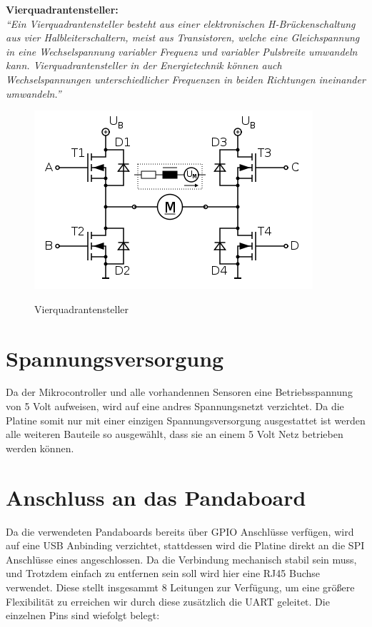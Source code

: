 \begin{minipage}{0.9\textwidth}
\textbf{Vierquadrantensteller:\\}
\emph{``Ein Vierquadrantensteller besteht aus einer elektronischen H-Brückenschaltung aus vier Halbleiterschaltern, meist aus Transistoren, 
welche eine Gleichspannung in eine Wechselspannung variabler Frequenz und variabler Pulsbreite umwandeln kann. Vierquadrantensteller 
in der Energietechnik können auch Wechselspannungen unterschiedlicher Frequenzen in beiden Richtungen ineinander umwandeln.''}\cite{vierquadrantensteller}
\end{minipage}

\begin{figure}[H]
\centering
\includegraphics[width=.8\textwidth]{Vierquadrantensteller.png}\\
\caption{Vierquadrantensteller \cite{vierquadrantensteller}}%
\label{fig:Vierquadrantensteller}
\end{figure}

\section{Spannungsversorgung}
Da der Mikrocontroller und alle vorhandennen Sensoren eine Betriebsspannung von 5 Volt aufweisen, wird auf eine andres Spannungsnetzt verzichtet.
Da die Platine somit nur mit einer einzigen Spannungsversorgung ausgestattet ist werden alle weiteren Bauteile so ausgewählt, dass sie 
an einem 5 Volt Netz betrieben werden können.

\section{Anschluss an das Pandaboard}
Da die verwendeten Pandaboards bereits über GPIO Anschlüsse verfügen, wird auf eine USB Anbinding verzichtet, stattdessen wird die Platine direkt an die SPI Anschlüsse
eines angeschlossen. Da die Verbindung mechanisch stabil sein muss, und Trotzdem einfach zu entfernen sein soll wird hier eine RJ45 Buchse verwendet.
Diese stellt insgesammt 8 Leitungen zur Verfügung, um eine größere Flexibilität zu erreichen wir durch diese zusätzlich die UART geleitet.
Die einzelnen Pins sind wiefolgt belegt:

